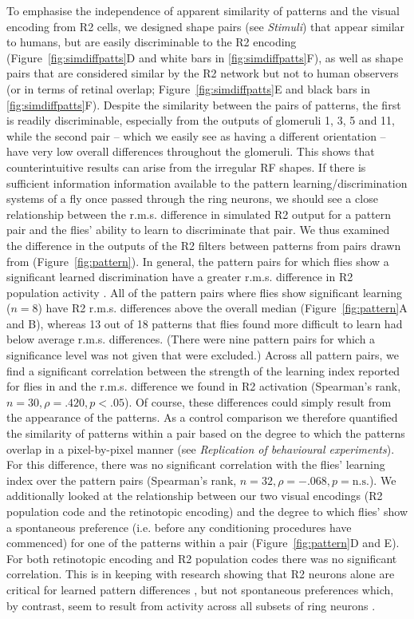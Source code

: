 \documentclass[10pt]{article}
\begin{document}
To emphasise the independence of apparent similarity of patterns and the visual encoding from R2 cells, we designed shape pairs (see \emph{Stimuli}) that appear similar to humans, but are easily discriminable to the R2 encoding (Figure~\ref{fig:simdiffpatts}D and white bars in \ref{fig:simdiffpatts}F), as well as shape pairs that are considered similar by the R2 network but not to human observers (or in terms of retinal overlap; Figure~\ref{fig:simdiffpatts}E and black bars in \ref{fig:simdiffpatts}F). Despite the similarity between the pairs of patterns, the first is readily discriminable, especially from the outputs of glomeruli 1, 3, 5 and 11, while the second pair – which we easily see as having a different orientation – have very low overall differences throughout the glomeruli. This shows that counterintuitive results can arise from the irregular RF shapes.
If there is sufficient information information available to the pattern learning/discrimination systems of a fly once passed through the ring neurons, we should see a close relationship between the r.m.s. difference in simulated R2 output for a pattern pair and the flies’ ability to learn to discriminate that pair. We thus examined the difference in the outputs of the R2 filters between patterns from pairs drawn from \cite{Ernst1999} (Figure~\ref{fig:pattern}). In general, the pattern pairs for which flies show a significant learned discrimination have a greater r.m.s. difference in R2 population activity \cite{Ernst1999}. All of the pattern pairs where flies show significant learning ($n = 8$) have R2 r.m.s. differences above the overall median (Figure~\ref{fig:pattern}A and B), whereas 13 out of 18 patterns that flies found more difficult to learn had below average r.m.s. differences. (There were nine pattern pairs for which a significance level was not given that were excluded.) Across all pattern pairs, we find a significant correlation between the strength of the learning index reported for flies in \cite{Ernst1999} and the r.m.s. difference we found in R2 activation (Spearman’s rank, $n = 30, \rho = .420, p < .05$). 
Of course, these differences could simply result from the appearance of the patterns. As a control comparison we therefore quantified the similarity of patterns within a pair based on the degree to which the patterns overlap in a pixel-by-pixel manner (see \emph{Replication of behavioural experiments}). For this difference, there was no significant correlation with the flies’ learning index over the pattern pairs (Spearman’s rank, $n = 32, \rho = -.068, p = \mathrm{n.s.}$). We additionally looked at the relationship between our two visual encodings (R2 population code and the retinotopic encoding) and the degree to which flies’ show a spontaneous preference (i.e. before any conditioning procedures have commenced) for one of the patterns within a pair (Figure~\ref{fig:pattern}D and E). For both retinotopic encoding and R2 population codes there was no significant correlation. This is in keeping with research showing that R2 neurons alone are critical for learned pattern differences \cite{Ernst1999}, but not spontaneous preferences which, by contrast, seem to result from activity across all subsets of ring neurons \cite{Solanki2015}.
\end{document}
